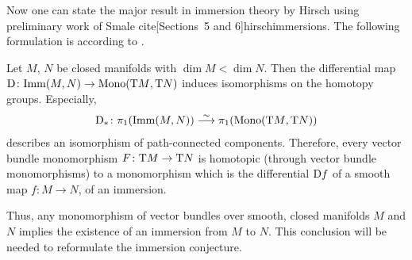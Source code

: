 Now one can state the major result in immersion theory by
Hirsch using preliminary work of Smale
cite[Sections~5 and 6]{hirschimmersions}.
The following formulation is according to
\cite[Theorem~1.2]{immersionconj}. %
\begin{Thm}\label{thm:hirschsmale}
  Let $M$, $N$ be closed manifolds with $\dim M<\dim N$.
  Then the differential map
  $\mathrm{D}\colon \mathrm{Imm}({M},{N})\to \mathrm{Mono}({\mathrm{T}M},{\mathrm{T}N})$
  induces isomorphisms on the homotopy groups.
  Especially,
  \begin{gather*}
    \mathrm{D}_*\colon
    \pi_1(\mathrm{Imm}({M},{N})) \overset\sim{\longrightarrow} \pi_1(\mathrm{Mono}({\mathrm{T}M},{\mathrm{T}N}))
  \end{gather*}
  describes an isomorphism of path-connected components.
  Therefore, every vector bundle monomorphism
  $F\colon\mathrm{T}M\to\mathrm{T}N$ is homotopic (through vector bundle
  monomorphisms) to a monomorphism which is the differential
  $\mathrm{D} f$ of a smooth map $f\colon M\to N$, \idest of an
  immersion.
\end{Thm}
Thus, any monomorphism of vector bundles over smooth, closed manifolds
$M$ and $N$ implies the existence of an immersion from $M$ to $N$.
This conclusion will be needed to reformulate the immersion conjecture.


